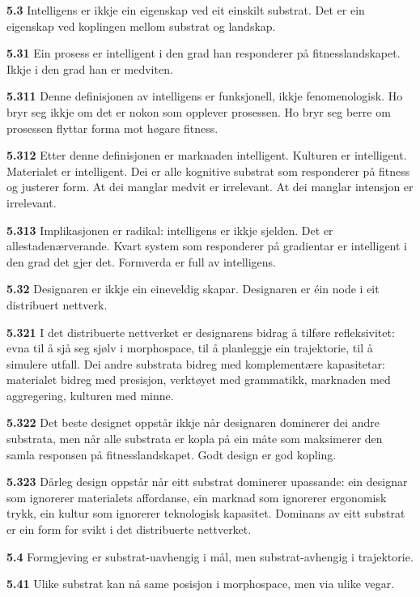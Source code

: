 \documentclass[11pt, a4paper]{article}
\newcommand{\subprop}[1]{\medskip\noindent\textbf{#1}\quad}
\begin{document}
\subprop{5.3} Intelligens er ikkje ein eigenskap ved eit einskilt substrat. Det er ein eigenskap ved koplingen mellom substrat og landskap.

\subprop{5.31} Ein prosess er intelligent i den grad han responderer p\aa{} fitnesslandskapet. Ikkje i den grad han er medviten.

\subprop{5.311} Denne definisjonen av intelligens er funksjonell, ikkje fenomenologisk. Ho bryr seg ikkje om det er nokon som \guillemotleft opplever\guillemotright{} prosessen. Ho bryr seg berre om prosessen flyttar forma mot h\o gare fitness.

\subprop{5.312} Etter denne definisjonen er marknaden intelligent. Kulturen er intelligent. Materialet er intelligent. Dei er alle kognitive substrat som responderer p\aa{} fitness og justerer form. At dei manglar medvit er irrelevant. At dei manglar intensjon er irrelevant.

\subprop{5.313} Implikasjonen er radikal: intelligens er ikkje sjelden. Det er allestadenærverande. Kvart system som responderer p\aa{} gradientar er intelligent i den grad det gjer det. Formverda er full av intelligens.

\subprop{5.32} Designaren er ikkje ein eineveldig skapar. Designaren er \'ein node i eit distribuert nettverk.

\subprop{5.321} I det distribuerte nettverket er designarens bidrag \aa{} tilf\o re refleksivitet: evna til \aa{} sj\aa{} seg sj\o lv i morphospace, til \aa{} planleggje ein trajektorie, til \aa{} simulere utfall. Dei andre substrata bidreg med komplement\ae re kapasitetar: materialet bidreg med presisjon, verkt\o yet med grammatikk, marknaden med aggregering, kulturen med minne.

\subprop{5.322} Det beste designet oppst\aa r ikkje n\aa r designaren dominerer dei andre substrata, men n\aa r alle substrata er kopla p\aa{} ein m\aa te som maksimerer den samla responsen p\aa{} fitnesslandskapet. Godt design er god kopling.

\subprop{5.323} D\aa rleg design oppst\aa r n\aa r eitt substrat dominerer upassande: ein designar som ignorerer materialets affordanse, ein marknad som ignorerer ergonomisk trykk, ein kultur som ignorerer teknologisk kapasitet. Dominans av eitt substrat er ein form for svikt i det distribuerte nettverket.

\subprop{5.4} Formgjeving er substrat-uavhengig i m\aa l, men substrat-avhengig i trajektorie.

\subprop{5.41} Ulike substrat kan n\aa{} same posisjon i morphospace, men via ulike vegar.
\end{document}
